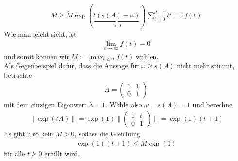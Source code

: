 \begin{solution}
\begin{align*}
  M\geq \widetilde{M} \exp(\underbrace{t(s(A) - \omega)}_{< 0})\sum_{i=0}^{d-1} t^d =: f(t)
\end{align*}
Wie man leicht sieht, ist
\begin{align*}
  \lim_{t \to \infty}f(t) = 0
\end{align*}
und somit können wir $M := \max_{t \geq 0} f(t)$ wählen. \\
Als Gegenbeispiel dafür, dass die Aussage für $\omega \geq s(A)$ nicht mehr stimmt,
betrachte
\begin{align*}
  A = \begin{pmatrix}
    1 & 1 \\ 0 & 1
  \end{pmatrix}
\end{align*}
mit dem einzigen Eigenwert $\lambda = 1$. Wähle also $\omega = s(A) = 1$ und berechne
\begin{align*}
  \|\exp(tA)\| = \exp(1)\|\begin{pmatrix}
    1 & t \\ 0 & 1
  \end{pmatrix}\|
  = \exp(1)(t+1)
\end{align*}
Es gibt also kein $M > 0$, sodass die Gleichung
\begin{align*}
  \exp(1)(t+1) \leq M \exp(1)
\end{align*}
für alle $t \geq 0$ erfüllt wird.
\end{solution}

